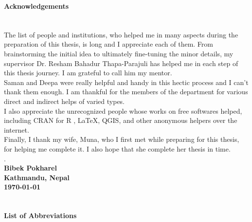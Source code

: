 \newpage
\begin{center}
\textbf{\large Acknowledgements}
\end{center}
\section*{}

\vspace{-10mm} 
The list of people and institutions, who helped me in many aspects during the preparation of this thesis, is long and  I appreciate each of them. From brainstorming the initial idea to ultimately fine-tuning the minor details, my supervisor Dr. Resham Bahadur Thapa-Parajuli has helped me in each step of this thesis journey. I am grateful to call him my mentor. \\
Saman and Deepa were really helpful and handy in this hectic process and I can't thank them enough. I am thankful for the members of the department for various direct and indirect helps of varied types.\\
I also appreciate the unrecognized people whose works on free softwares helped, including CRAN for R , \LaTeX{}, QGIS, and other anonymous helpers over the internet.\\
Finally, I thank my wife, Muna, who I first met while preparing for this thesis, for helping me complete it. I also hope that she complete her thesis in time.\\
.\vspace{5mm}\\ 
\textbf{Bibek Pokharel}\\
\textbf{Kathmandu, Nepal}\\
\textbf{\today}

\newpage
\begin{center}
\tableofcontents
\end{center}

\newpage
\begin{center}
\listoftables

\section*{}

\newpage
\listoffigures
\section*{}


\newpage
\textbf{\large List of Abbreviations}
\end{center}
